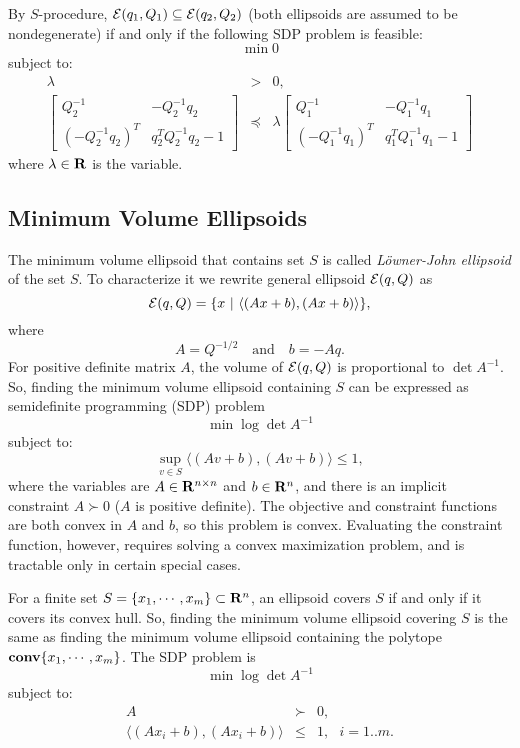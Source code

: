 By $S$-procedure, $\EE(q_1,Q_1)\subseteq\EE(q_2,Q_2)$
(both ellipsoids are assumed to be nondegenerate)
if and only if the following SDP problem is feasible:
\[ \min 0 \]
subject to:
\begin{eqnarray*}
\lambda & > & 0, \\
\left[\begin{array}{cc}
Q_2^{-1} & -Q_2^{-1}q_2\\
(-Q_2^{-1}q_2)^T & q_2^TQ_2^{-1}q_2-1\end{array}\right]
& \preceq &
\lambda \left[\begin{array}{cc}
Q_1^{-1} & -Q_1^{-1}q_1\\
(-Q_1^{-1}q_1)^T & q_1^TQ_1^{-1}q_1-1\end{array}\right]
\end{eqnarray*}
where $\lambda\in{\bf R}$ is the variable.





\subsection{Minimum Volume Ellipsoids}
The minimum volume ellipsoid that contains set $S$ is called
\emph{L\"{o}wner-John ellipsoid} of the set $S$.
To characterize it we rewrite general ellipsoid $\EE(q,Q)$ as
\[ \EE(q,Q) = \{x ~|~ \langle (Ax + b), (Ax + b)\rangle \}, \]
where
\[ A = Q^{-1/2} ~~~ \mbox{ and } ~~~ b = -Aq .\]
For positive definite matrix $A$, the volume of $\EE(q,Q)$ is proportional
to $\det A^{-1}$.
So, finding the minimum volume ellipsoid containing $S$
can be expressed as semidefinite programming (SDP) problem
\[ \min \log \det A^{-1} \]
subject to:
\[ \sup_{v\in S} \langle (Av + b), (Av + b)\rangle \leq 1, \]
where the variables are $A\in{\bf R}^{n\times n}$ and $b\in{\bf R}^n$, and
there is an implicit constraint $A\succ 0$ ($A$ is positive definite).
The objective and constraint functions are both convex in $A$ and $b$, so
this problem is convex.
Evaluating the constraint function, however, requires solving a convex
maximization problem, and is tractable only in certain special cases.


For a finite set $S=\{x_1,\cdots,x_m\}\subset{\bf R}^n$, an ellipsoid covers
$S$ if and only if it covers its convex hull.
So, finding the minimum volume ellipsoid covering $S$ is the same as
finding the minimum volume ellipsoid containing the polytope
${\bf conv}\{x_1,\cdots,x_m\}$.
The SDP problem is
\[ \min \log \det A^{-1} \]
subject to:
\begin{eqnarray*}
A & \succ & 0, \\
\langle (Ax_i + b), (Ax_i + b)\rangle & \leq & 1, ~~~ i=1..m.
\end{eqnarray*}


